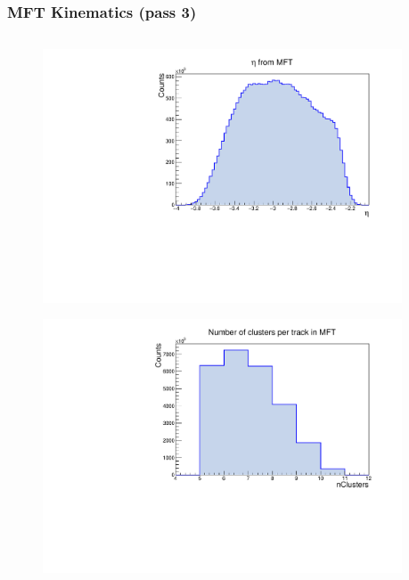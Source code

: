 \documentclass[10pt]{beamer}
\begin{document}
\begin{frame}
    \frametitle{MFT Kinematics (pass 3)}

    \begin{columns}
        \begin{column}{0.5\textwidth}
            \vspace*{-0.43cm}
            \begin{figure}
                \begin{center}
                    \includegraphics[width=0.95\textwidth]{Plots/pass3_MFT/MFTeta_pass3.pdf}
                \end{center}
            \end{figure}
            \vspace*{-0.6cm}
            \begin{figure}
                \begin{center}
                    \includegraphics[width=0.95\textwidth]{Plots/pass3_MFT/nClusters_pass3.pdf}

\end{center}
\end{figure}
\end{column}
\end{columns}
\end{frame}
\end{document}
